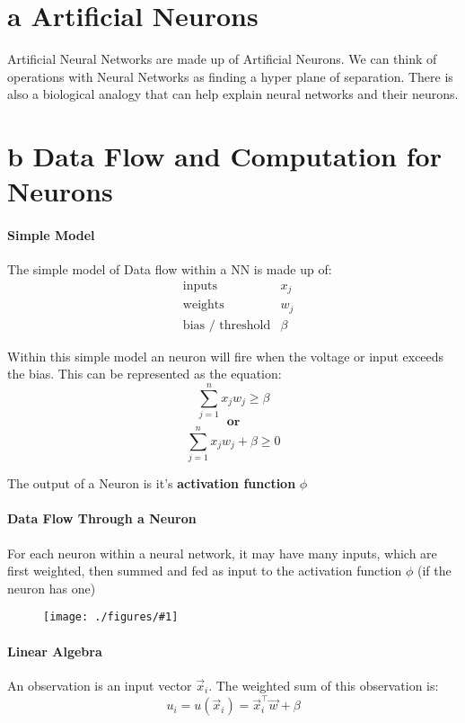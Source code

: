 \documentclass[12pt]{book}
\title{\coursetitle\linebreak\lecturename}
\author{\\Cain Susko\\ 
           \\ \\ \\
      Queen's University 
    \\School of Computing\\}
\newcommand{\incimg}[2]{%
       \begin{figure}[h]
               \centering
               \texttt{[image: ./figures/\#1]}
       \end{figure}
}
\begin{document}
\begin{titlepage}
        \maketitle
\end{titlepage}


\section*{a Artificial Neurons}
Artificial Neural Networks are made up of Artificial Neurons. We
can think of operations with Neural Networks as finding a hyper plane 
of separation. There is also a biological analogy that can help explain
neural networks and their neurons.


\section*{b Data Flow and Computation for Neurons}
\paragraph{Simple Model}
The simple model of Data flow within a NN is made up of:
\begin{align*}
        &\text{inputs} &x_j\\
        &\text{weights} &w_j\\
        &\text{bias / threshold} &\beta
\end{align*}

Within this simple model an neuron will fire when the voltage or input
exceeds the bias. 
This can be represented as the equation:
\[\sum^n_{j=1} x_jw_j \geq \beta\]
\[\textbf{or}\]
\[\sum^n_{j=1} x_jw_j + \beta \geq 0\]

The output of a Neuron is it's \textbf{activation function} $\phi$

\paragraph{Data Flow Through a Neuron}
For each neuron within a neural network, it may have many inputs, which
are first weighted, then summed and fed as input to the activation 
function $\phi$ 
(if the neuron has one)
\incimg{NNData}{0.5}

\paragraph{Linear Algebra}
An observation is an input vector $\vec x_i$. The weighted sum of
this observation is:
\[u_i = u(\vec x_i)  = \vec x_i^\top \vec w + \beta\]
\end{document}
